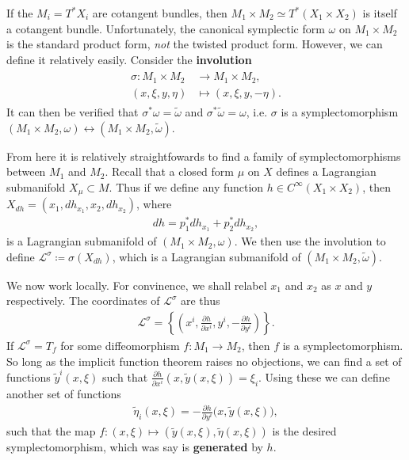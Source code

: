 \documentclass[11pt, final]{article}
\begin{document}
\begin{example}
	If the $M_i = T^*X_i$ are cotangent bundles, then $M_1 \times M_2 \simeq T^*(X_1 \times X_2)$ is itself a cotangent bundle. Unfortunately, the canonical symplectic form $\omega$ on $M_1 \times M_2$ is the standard product form, \textit{not} the twisted product form. However, we can define it relatively easily. Consider the \textbf{involution}
		\begin{align}
			\begin{split}
				\sigma: M_1 \times M_2 &\to M_1 \times M_2, \\
						(x,\xi, y, \eta) &\mapsto (x, \xi, y, -\eta).
			\end{split}
		\end{align}
	It can then be verified that $\sigma^* \omega = \tilde{\omega}$ and $\sigma^* \tilde{\omega} = \omega$, i.e. $\sigma$ is a symplectomorphism $(M_1 \times M_2, \omega) \leftrightarrow (M_1\times M_2, \tilde{\omega})$.
	
From here it is relatively straightfowards to find a family of symplectomorphisms between $M_1$ and $M_2$. Recall that a closed form $\mu$ on $X$ defines a Lagrangian submanifold $X_\mu \subset M$. Thus if we define any function $h \in C^\infty(X_1 \times X_2)$, then $X_{dh} = (x_1, dh_{x_1}, x_2, dh_{x_2})$, where 
	\begin{align}\label{eq:splitGenFunc}
		dh = p_1^* dh_{x_1} + p_2^* dh_{x_2}, 
	\end{align}
is a Lagrangian submanifold of $(M_1 \times M_2,\omega)$. We then use the involution to define $\mathcal{L}^\sigma \coloneqq \sigma(X_{dh})$, which is a Lagrangian submanifold of $(M_1 \times M_2,\tilde{\omega})$.

We now work locally. For convinence, we shall relabel $x_1$ and $x_2$ as $x$ and $y$ respectively. The coordinates of $\mathcal{L}^\sigma$ are thus
	\begin{align}
		\mathcal{L}^\sigma = \left\{ \left(x^i, \tfrac{\partial h}{\partial x^i}, y^i, - \tfrac{\partial h}{\partial y^i} \right) \right\}.
	\end{align}
If $\mathcal{L}^\sigma = T_f$ for some diffeomorphism $f: M_1 \to M_2$, then $f$ is a symplectomorphism.
So long as the implicit function theorem raises no objections, we can find a set of functions $\tilde{y}^i(x,\xi)$ such that $\tfrac{\partial h}{\partial x^i}(x,\tilde{y}(x,\xi)) = \xi_i$. Using these we can define another set of functions
	\begin{align}
		\tilde{\eta}_i(x,\xi) = - \tfrac{\partial h}{\partial y^i}\big(x, \tilde{y}(x,\xi)\big),
	\end{align}
such that the map $f:(x,\xi) \mapsto (\tilde{y}(x,\xi), \tilde{\eta}(x,\xi))$ is the desired symplectomorphism, which was say is \textbf{generated} by $h$.
\end{example}
\end{document}
